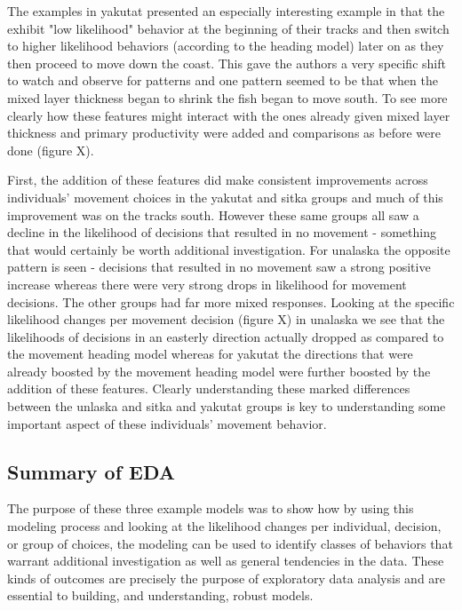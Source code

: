 \documentclass[11pt]{article}
\begin{document}
The examples in yakutat presented an especially interesting example in that the exhibit "low likelihood" behavior at the beginning of their tracks and then switch to higher likelihood behaviors (according to the heading model) later on as they then proceed to move down the coast. This gave the authors a very specific shift to watch and observe for patterns and one pattern seemed to be that when the mixed layer thickness began to shrink the fish began to move south. To see more clearly how these features might interact with the ones already given mixed layer thickness and primary productivity were added and comparisons as before were done (figure X). 

First, the addition of these features did make consistent improvements across individuals' movement choices in the yakutat and sitka groups and much of this improvement was on the tracks south. However these same groups all saw a decline in the likelihood of decisions that resulted in no movement - something that would certainly be worth additional investigation. For unalaska the opposite pattern is seen - decisions that resulted in no movement saw a strong positive increase whereas there were very strong drops in likelihood for movement decisions. The other groups had far more mixed responses. Looking at the specific likelihood changes per movement decision (figure X) in unalaska we see that the likelihoods of decisions in an easterly direction actually dropped as compared to the movement heading model whereas for yakutat the directions that were already boosted by the movement heading model were further boosted by the addition of these features. Clearly understanding these marked differences between the unlaska and sitka and yakutat groups is key to understanding some important aspect of these individuals' movement behavior.

\subsection*{Summary of EDA}

The purpose of these three example models was to show how by using this modeling process and looking at the likelihood changes per individual, decision, or group of choices, the modeling can be used to identify classes of behaviors that warrant additional investigation as well as general tendencies in the data. These kinds of outcomes are precisely the purpose of exploratory data analysis and are essential to building, and understanding, robust models. 
\end{document}
